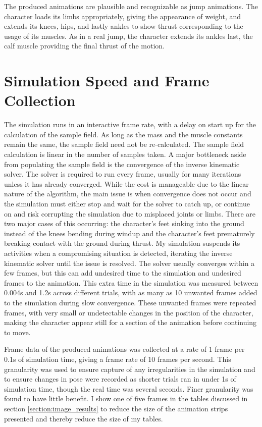 The produced animations are plausible and recognizable as jump animations.  The character loads its limbs appropriately, giving the appearance of weight, and extends its knees, hips, and lastly ankles to show thrust corresponding to the usage of its muscles.  As in a real jump, the character extends its ankles last, the calf muscle providing the final thrust of the motion.


\section{Simulation Speed and Frame Collection}
\label{section:speed_frame_results}
The simulation runs in an interactive frame rate, with a delay on start up for the calculation of the sample field.  As long as the mass and the muscle constants remain the same, the sample field need not be re-calculated.  The sample field calculation is linear in the number of samples taken.  A major bottleneck aside from populating the sample field is the convergence of the inverse kinematic solver.  The solver is required to run every frame, usually for many iterations unless it has already converged.  While the cost is manageable due to the linear nature of the algorithm, the main issue is when convergence does not occur and the simulation must either stop and wait for the solver to catch up, or continue on and risk corrupting the simulation due to misplaced joints or limbs.  There are two major cases of this occurring: the character's feet sinking into the ground instead of the knees bending during windup and the character's feet prematurely breaking contact with the ground during thrust.  My simulation suspends its activities when a compromising situation is detected, iterating the inverse kinematic solver until the issue is resolved.  The solver usually converges within a few frames, but this can add undesired time to the simulation and undesired frames to the animation.  This extra time in the simulation was measured between 0.004s and 1.2s across different trials, with as many as 10 unwanted frames added to the simulation during slow convergence.  These unwanted frames were repeated frames, with very small or undetectable changes in the position of the character, making the character appear still for a section of the animation before continuing to move.

Frame data of the produced animations was collected at a rate of 1 frame per 0.1s of simulation time, giving a frame rate of 10 frames per second.  This granularity was used to ensure capture of any irregularities in the simulation and to ensure changes in pose were recorded as shorter trials ran in under 1s of simulation time, though the real time was several seconds.  Finer granularity was found to have little benefit.  I show one of five frames in the tables discussed in section \ref{section:image_results} to reduce the size of the animation strips presented and thereby reduce the size of my tables.

